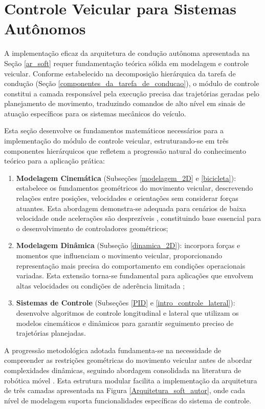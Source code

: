 \section{Controle Veicular para Sistemas Autônomos} \label{modelagem_veiculos}

A implementação eficaz da arquitetura de condução autônoma apresentada na Seção \ref{ar_soft} requer fundamentação teórica sólida em modelagem e controle veicular. Conforme estabelecido na decomposição hierárquica da tarefa de condução (Seção \ref{componentes_da_tarefa_de_conducao}), o módulo de controle constitui a camada responsável pela execução precisa das trajetórias geradas pelo planejamento de movimento, traduzindo comandos de alto nível em sinais de atuação específicos para os sistemas mecânicos do veículo.

Esta seção desenvolve os fundamentos matemáticos necessários para a implementação do módulo de controle veicular, estruturando-se em três componentes hierárquicos que refletem a progressão natural do conhecimento teórico para a aplicação prática:

\begin{enumerate}
\item \textbf{Modelagem Cinemática} (Subseções \ref{modelagem_2D} e \ref{bicicleta}): estabelece os fundamentos geométricos do movimento veicular, descrevendo relações entre posições, velocidades e orientações sem considerar forças atuantes. Esta abordagem demonstra-se adequada para cenários de baixa velocidade onde acelerações são desprezíveis \cite{paden2016survey}, constituindo base essencial para o desenvolvimento de controladores geométricos;

\item \textbf{Modelagem Dinâmica} (Subseção \ref{dinamica_2D}): incorpora forças e momentos que influenciam o movimento veicular, proporcionando representação mais precisa do comportamento em condições operacionais variadas. Esta extensão torna-se fundamental para aplicações que envolvem altas velocidades ou condições de aderência limitada \cite{jacobson2020vehicle};

\item \textbf{Sistemas de Controle} (Subseções \ref{PID} e \ref{intro_controle_lateral}): desenvolve algoritmos de controle longitudinal e lateral que utilizam os modelos cinemáticos e dinâmicos para garantir seguimento preciso de trajetórias planejadas.
\end{enumerate}

A progressão metodológica adotada fundamenta-se na necessidade de compreender as restrições geométricas do movimento veicular antes de abordar complexidades dinâmicas, seguindo abordagem consolidada na literatura de robótica móvel \cite{lavalle2006planning}. Esta estrutura modular facilita a implementação da arquitetura de três camadas apresentada na Figura \ref{Arquitetura_soft_autor}, onde cada nível de modelagem suporta funcionalidades específicas do sistema de controle.

